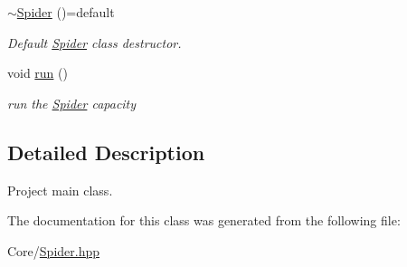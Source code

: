 \begin{DoxyCompactItemize}
\mbox{\label{class_spider_1_1_core_1_1_spider_ad2b5f7232a941c1753a44a3f0f305cf6}} 
\hyperlink{class_spider_1_1_core_1_1_spider_ad2b5f7232a941c1753a44a3f0f305cf6}{$\sim$\+Spider} ()=default
\begin{DoxyCompactList}\small\item\em Default \hyperlink{class_spider_1_1_core_1_1_spider}{Spider} class destructor. \end{DoxyCompactList}\item 
\mbox{\label{class_spider_1_1_core_1_1_spider_a0b3a28931f796bf11eafbf27edd5dc14}} 
void \hyperlink{class_spider_1_1_core_1_1_spider_a0b3a28931f796bf11eafbf27edd5dc14}{run} ()
\begin{DoxyCompactList}\small\item\em run the \hyperlink{class_spider_1_1_core_1_1_spider}{Spider} capacity \end{DoxyCompactList}\end{DoxyCompactItemize}


\subsection{Detailed Description}
Project main class. 

The documentation for this class was generated from the following file\+:\begin{DoxyCompactItemize}
\item 
Core/\hyperlink{_spider_8hpp}{Spider.\+hpp}\end{DoxyCompactItemize}
